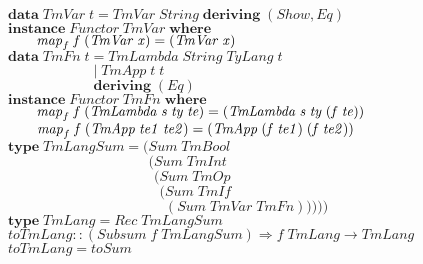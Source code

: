 \documentclass[10pt]{article}
\newcommand{\Conid}[1]{\mathit{#1}}
\newcommand{\Varid}[1]{\mathit{#1}}
\begin{document}
\begin{tabbing}
${}$\\
${\mathbf{data}\;\Conid{TmVar}\;\Varid{t}\mathrel{=}\Conid{TmVar}\;\Conid{String}\;\mathbf{deriving}\;(\Conid{Show},\Conid{Eq})}$\\
${}$\\
${\mathbf{instance}\;\Conid{Functor}\;\Conid{TmVar}\;\mathbf{where}}$\\
${\hskip2.00em\relax\Varid{map}_{f}\;\Varid{f}\;(\Conid{TmVar}\;\Varid{x})\mathrel{=}(\Conid{TmVar}\;\Varid{x})}$\\
${}$\\
${\mathbf{data}\;\Conid{TmFn}\;\Varid{t}\mathrel{=}\Conid{TmLambda}\;\Conid{String}\;\Conid{TyLang}\;\Varid{t}}$\\
${\phantom{\mathbf{data}\;\Conid{TmFn}\;\Varid{t}\mbox{}}\mid \Conid{TmApp}\;\Varid{t}\;\Varid{t}}$\\
${\phantom{\mathbf{data}\;\Conid{TmFn}\;\Varid{t}\mbox{}}\phantom{\mid \mbox{}}\mathbf{deriving}\;(\Conid{Eq})}$\\
${}$\\
${\mathbf{instance}\;\Conid{Functor}\;\Conid{TmFn}\;\mathbf{where}}$\\
${\hskip2.00em\relax\Varid{map}_{f}\;\Varid{f}\;(\Conid{TmLambda}\;\Varid{s}\;\Varid{ty}\;\Varid{te})\mathrel{=}(\Conid{TmLambda}\;\Varid{s}\;\Varid{ty}\;(\Varid{f}\;\Varid{te}))}$\\
${\hskip2.00em\relax\Varid{map}_{f}\;\Varid{f}\;(\Conid{TmApp}\;\Varid{te1}\;\Varid{te2})\mathrel{=}(\Conid{TmApp}\;(\Varid{f}\;\Varid{te1})\;(\Varid{f}\;\Varid{te2}))}$\\
${}$\\
${\mathbf{type}\;\Conid{TmLangSum}\mathrel{=}(\Conid{Sum}\;\Conid{TmBool}}$\\
${\phantom{\mathbf{type}\;\Conid{TmLangSum}\mathrel{=}(\mbox{}}(\Conid{Sum}\;\Conid{TmInt}}$\\
${\phantom{\mathbf{type}\;\Conid{TmLangSum}\mathrel{=}(\mbox{}}\phantom{(\mbox{}}(\Conid{Sum}\;\Conid{TmOp}}$\\
${\phantom{\mathbf{type}\;\Conid{TmLangSum}\mathrel{=}(\mbox{}}\phantom{(\mbox{}}\phantom{(\mbox{}}(\Conid{Sum}\;\Conid{TmIf}}$\\
${\phantom{\mathbf{type}\;\Conid{TmLangSum}\mathrel{=}(\mbox{}}\phantom{(\mbox{}}\phantom{(\mbox{}}\phantom{(\mbox{}}(\Conid{Sum}\;\Conid{TmVar}\;\Conid{TmFn})))))}$\\
${}$\\
${\mathbf{type}\;\Conid{TmLang}\mathrel{=}\Conid{Rec}\;\Conid{TmLangSum}}$\\
${}$\\
${}$\\
${\Varid{toTmLang}\mathbin{::}(\Conid{Subsum}\;\Varid{f}\;\Conid{TmLangSum})\Rightarrow \Varid{f}\;\Conid{TmLang}\to \Conid{TmLang}}$\\
${\Varid{toTmLang}\mathrel{=}\Varid{toSum}}$
\end{tabbing}
\end{document}
